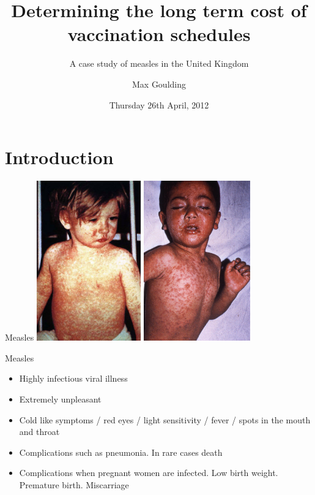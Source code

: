 \documentclass{beamer}
\title{Determining the long term cost of vaccination schedules}
\subtitle{A case study of measles in the United Kingdom}
\author{Max Goulding}
\date{Thursday 26th April, 2012}
\begin{document}
\begin{frame}
\titlepage
\end{frame}

\section{Introduction}
\begin{frame}{Measles}
\centering
\includegraphics[width=45mm]{measleseuropean.jpg}
\includegraphics[width=46.1mm]{measleschild.jpg}
\end{frame}

\begin{frame}{Measles}
\begin{itemize}
\item{Highly infectious viral illness}
\item{Extremely unpleasant}
\item{Cold like symptoms / red eyes / light sensitivity / fever / spots in the mouth and throat}
\item {Complications such as pneumonia. In rare cases death}
\item{Complications when pregnant women are infected. Low birth weight. Premature birth. Miscarriage}
\end{itemize}
\end{frame}
\end{document}
